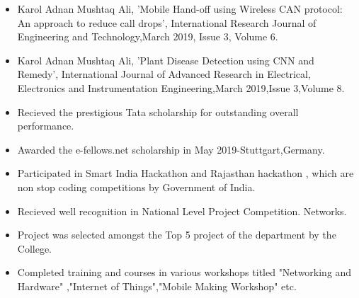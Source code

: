 

















\begin{itemize}
    \item Karol Adnan Mushtaq Ali, 'Mobile Hand-off using Wireless CAN protocol: An approach to reduce call drops', International
Research Journal of Engineering and Technology,March 2019, Issue 3, Volume 6.
    \item Karol Adnan Mushtaq Ali, 'Plant Disease Detection using CNN and Remedy', International Journal of Advanced Research in
Electrical, Electronics and Instrumentation Engineering,March 2019,Issue 3,Volume 8.


   
\end{itemize}


\begin{itemize}
    \item Recieved the prestigious Tata scholarship for outstanding overall performance.
    \item Awarded the e-fellows.net scholarship in May 2019-Stuttgart,Germany.
    \item Participated in Smart India Hackathon and Rajasthan hackathon , which are non stop coding competitions by Government of India.
    \item Recieved well recognition in National Level Project  Competition. Networks.
    \item  Project was selected amongst the Top 5 project of the department by the College.
    \item Completed training and courses in various workshops titled "Networking and Hardware" ,"Internet of Things","Mobile Making Workshop" etc.
    
\end{itemize}


\dividers